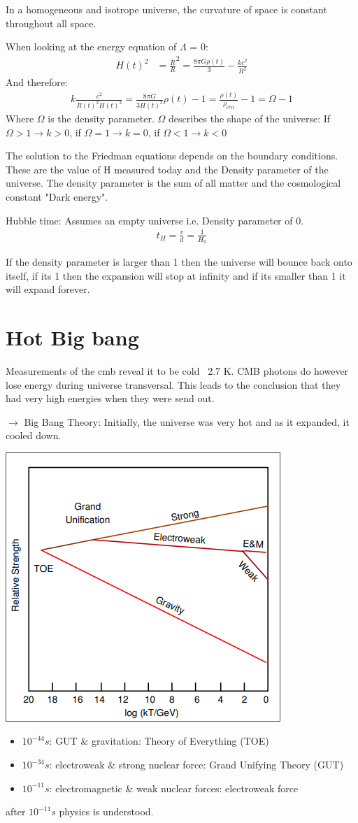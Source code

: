 \documentclass[11pt,a4paper]{article}
\begin{document}
In a homogeneous and isotrope universe, the curvature of space is constant throughout all space.

When looking at the energy equation of $\Lambda$ = 0:
\begin{align*}
    H(t)^2 &= \frac {\dot R} {R} ^2 = \frac {8 \pi G \rho (t)}{3} - \frac {kc^2}{R^2}
\end{align*}
And therefore:
\begin{align*}
    k \frac {c^2}{R(t)^2H(t)^2} = \frac {8 \pi G}{3 H(t)^2}\rho (t)-1 = \frac {\rho (t)}{\rho_{crit}} -1 = \Omega -1
\end{align*}
Where $\Omega$ is the density parameter.
$\Omega$ describes the shape of the universe:
If $\Omega > 1 \rightarrow k > 0$, if $\Omega = 1 \rightarrow k = 0$, if $\Omega < 1 \rightarrow k < 0$

The solution to the Friedman equations depends on the boundary conditions. 
These are the value of H measured today and the Density parameter of the universe.
The density parameter is the sum of all matter and the cosmological constant "Dark energy".

Hubble time: 
Assumes an empty universe i.e. Density parameter of 0. 
\begin{align*}
    t_H = \frac v d  = \frac 1 {H_0}
\end{align*}

If the density parameter is larger than 1 then the universe will bounce back onto itself, if its 1 then the expansion will stop at infinity and if its smaller than 1 it will expand forever.
\section{Hot Big bang}
Measurements of the cmb reveal it to be cold ~2.7 K.
CMB photons do however lose energy during universe transversal.
This leads to the conclusion that they had very high energies when they were send out.

$\rightarrow$ Big Bang Theory: Initially, the universe was very hot and as it expanded,
it cooled down.
\begin{center}
    \includegraphics[width=0.3\linewidth]{screenshot_2024-01-28-133552.png}
\end{center}
\begin{itemize}
    \item $10^{-44}s$: GUT \& gravitation: Theory of Everything (TOE)
    \item $10^{-34}s$: electroweak \& strong nuclear force: Grand Unifying Theory (GUT)
    \item $10^{-11}s$: electromagnetic \& weak nuclear
forces: electroweak force
\end{itemize}
after $10^{-11}s$ physics is understood.
\end{document}
